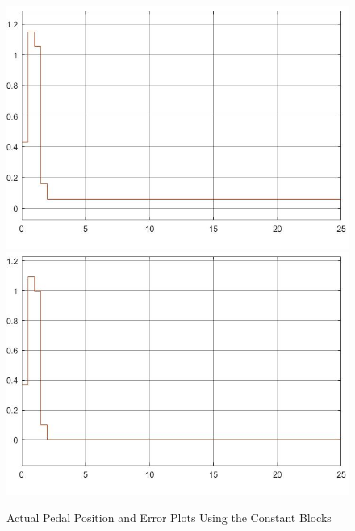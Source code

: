 \documentclass[journal,twoside,web]{ieeecolor}
\begin{document}
\begin{figure}[h]
	\centering
		{\includegraphics[width=0.48\linewidth]{figs/img/brakeSysActualPedalPositionConstantBlocks}}
		{\includegraphics[width=0.48\linewidth]{figs/img/brakeSysPedalPositionErrorConstantBlocks}}
	\caption{Actual Pedal Position and Error Plots Using the Constant Blocks}
\end{figure}






%
\end{document}
